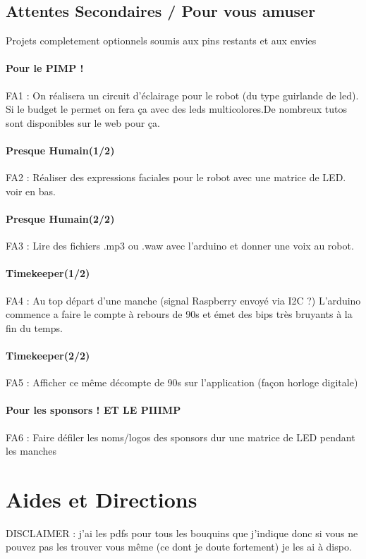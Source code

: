 \documentclass[fleqn,10pt]{SelfArx} %
\begin{document}
\subsection{Attentes Secondaires / Pour vous amuser}
Projets completement optionnels soumis aux pins restants et aux envies
\paragraph{Pour le PIMP !}
FA1 : On réalisera un circuit d'éclairage pour le robot (du type guirlande de led). Si le budget le permet on fera ça avec des leds multicolores.De nombreux tutos sont disponibles sur le web pour ça.
\paragraph{Presque Humain(1/2)}
FA2 : Réaliser des expressions faciales pour le robot avec une matrice de LED. voir en bas.
\paragraph{Presque Humain(2/2)}
FA3 : Lire des fichiers .mp3 ou .waw avec l'arduino et donner une voix au robot.
\paragraph{Timekeeper(1/2)}
FA4 : Au top départ d'une manche (signal Raspberry envoyé via I2C ?) L'arduino commence a faire le compte à rebours de 90s et émet des bips très bruyants à la fin du temps.
\paragraph{Timekeeper(2/2)}
FA5 : Afficher ce même décompte de 90s sur l'application (façon horloge digitale)
\paragraph{Pour les sponsors ! ET LE PIIIMP}
FA6 : Faire défiler les noms/logos des sponsors dur une matrice de LED pendant les manches


\section{Aides et Directions}

DISCLAIMER : j'ai les pdfs pour tous les bouquins que j'indique donc si vous ne pouvez pas les trouver vous même (ce dont je doute fortement) je les ai à dispo.
\end{document}
